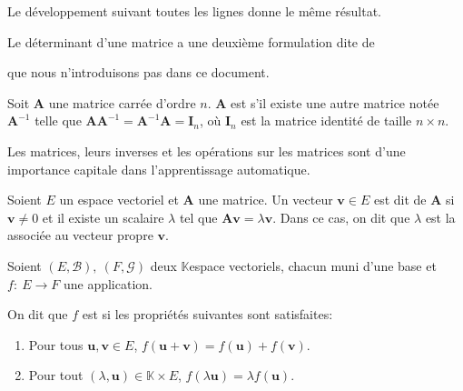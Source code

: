 \documentclass[letterpaper,11pt,english]{sphinxmanual}
\begin{document}
\begin{DUlineblock}{0em}
\item[]  Le développement suivant toutes les lignes donne le même
résultat.
\item[] Le déterminant d’une matrice a une deuxième formulation dite de
%
\begin{footnote}[6]\sphinxAtStartFootnote
{}
%
\end{footnote} que
nous n’introduisons pas dans ce document.
\item[]  Soit \(\mathbf{A}\) une matrice carrée
d’ordre \(n\). \(\mathbf{A}\) est  s’il existe
une autre matrice notée \(\mathbf{A}^{-1}\) telle que
\(\mathbf{A}\mathbf{A}^{-1}=\mathbf{A}^{-1}\mathbf{A}=\mathbf{I}_n\),
où \(\mathbf{I}_n\) est la matrice identité de taille
\(n\times n\).
\item[] Les matrices, leurs inverses et les opérations sur les matrices sont
d’une importance capitale dans l’apprentissage automatique.
\item[] 
\item[] Soient \(E\) un espace vectoriel et \(\mathbf{A}\) une
matrice. Un vecteur \(\mathbf{v}\in E\) est dit 
de \(\mathbf{A}\) si \(\mathbf{v}\neq 0\) et il existe un
scalaire \(\lambda\) tel que
\(\mathbf{A}\mathbf{v}=\lambda \mathbf{v}\). Dans ce cas, on dit
que \(\lambda\) est la  associée au vecteur
propre \(\mathbf{v}\).
\end{DUlineblock}

\begin{DUlineblock}{0em}
\item[] 
\item[] Soient \((E, \mathcal{B}),\ (F, \mathcal{G})\) deux
\(\mathbb{K}\)\sphinxhyphen{}espace vectoriels, chacun muni d’une base et
\(f:\ E \rightarrow F\) une application.
\item[] On dit que \(f\) est  si les propriétés suivantes sont
satisfaites:
\end{DUlineblock}
\begin{enumerate}
%
\item {} 
\sphinxAtStartPar
Pour tous \(\mathbf{u}, \mathbf{v}\in E\),
\(f(\mathbf{u}+\mathbf{v})=f(\mathbf{u})+f(\mathbf{v})\).

\item {} 
\sphinxAtStartPar
Pour tout \((\lambda, \mathbf{u}) \in \mathbb{K}\times E\),
\(f(\lambda \mathbf{u})=\lambda f(\mathbf{u})\).

\end{enumerate}
\end{document}
